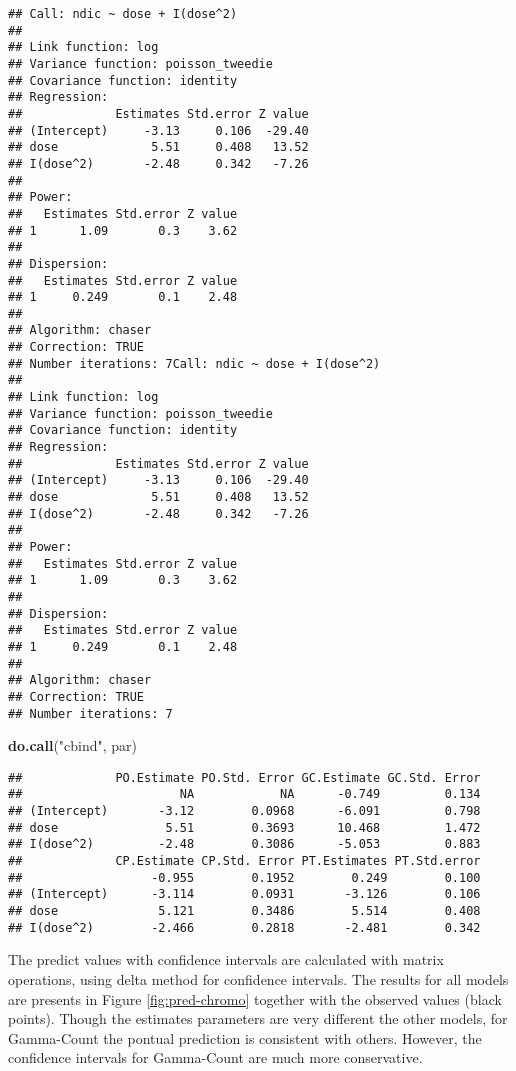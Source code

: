 \documentclass[9pt,a5paper,]{book}
\newenvironment{Shaded}{}{}
\newcommand{\KeywordTok}[1]{\textbf{{#1}}}
\newcommand{\StringTok}[1]{{#1}}
\newcommand{\NormalTok}[1]{{#1}}
\renewenvironment{Shaded}{\color{inputcolor}}{}
\theoremstyle{definition}
\theoremstyle{definition}
\theoremstyle{remark}
\begin{document}
\begin{verbatim}
## Call: ndic ~ dose + I(dose^2)
## 
## Link function: log
## Variance function: poisson_tweedie
## Covariance function: identity
## Regression:
##             Estimates Std.error Z value
## (Intercept)     -3.13     0.106  -29.40
## dose             5.51     0.408   13.52
## I(dose^2)       -2.48     0.342   -7.26
## 
## Power:
##   Estimates Std.error Z value
## 1      1.09       0.3    3.62
## 
## Dispersion:
##   Estimates Std.error Z value
## 1     0.249       0.1    2.48
## 
## Algorithm: chaser
## Correction: TRUE
## Number iterations: 7Call: ndic ~ dose + I(dose^2)
## 
## Link function: log
## Variance function: poisson_tweedie
## Covariance function: identity
## Regression:
##             Estimates Std.error Z value
## (Intercept)     -3.13     0.106  -29.40
## dose             5.51     0.408   13.52
## I(dose^2)       -2.48     0.342   -7.26
## 
## Power:
##   Estimates Std.error Z value
## 1      1.09       0.3    3.62
## 
## Dispersion:
##   Estimates Std.error Z value
## 1     0.249       0.1    2.48
## 
## Algorithm: chaser
## Correction: TRUE
## Number iterations: 7
\end{verbatim}

\begin{Shaded}
\begin{Highlighting}[]
\KeywordTok{do.call}\NormalTok{(}\StringTok{"cbind"}\NormalTok{, par)}
\end{Highlighting}
\end{Shaded}

\begin{verbatim}
##             PO.Estimate PO.Std. Error GC.Estimate GC.Std. Error
##                      NA            NA      -0.749         0.134
## (Intercept)       -3.12        0.0968      -6.091         0.798
## dose               5.51        0.3693      10.468         1.472
## I(dose^2)         -2.48        0.3086      -5.053         0.883
##             CP.Estimate CP.Std. Error PT.Estimates PT.Std.error
##                  -0.955        0.1952        0.249        0.100
## (Intercept)      -3.114        0.0931       -3.126        0.106
## dose              5.121        0.3486        5.514        0.408
## I(dose^2)        -2.466        0.2818       -2.481        0.342
\end{verbatim}

The predict values with confidence intervals are calculated with matrix
operations, using delta method for confidence intervals. The results for
all models are presents in Figure \ref{fig:pred-chromo} together with
the observed values (black points). Though the estimates parameters are
very different the other models, for Gamma-Count the pontual prediction
is consistent with others. However, the confidence intervals for
Gamma-Count are much more conservative.
\end{document}
